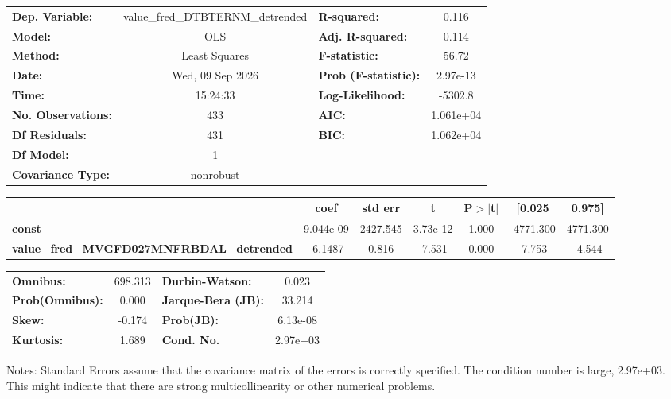 \begin{center}
\begin{tabular}{lclc}
\toprule
\textbf{Dep. Variable:}                           & value\_fred\_DTBTERNM\_detrended & \textbf{  R-squared:         } &     0.116   \\
\textbf{Model:}                                   &               OLS                & \textbf{  Adj. R-squared:    } &     0.114   \\
\textbf{Method:}                                  &          Least Squares           & \textbf{  F-statistic:       } &     56.72   \\
\textbf{Date:}                                    &         Wed, 09 Sep 2026         & \textbf{  Prob (F-statistic):} &  2.97e-13   \\
\textbf{Time:}                                    &             15:24:33             & \textbf{  Log-Likelihood:    } &   -5302.8   \\
\textbf{No. Observations:}                        &                 433              & \textbf{  AIC:               } & 1.061e+04   \\
\textbf{Df Residuals:}                            &                 431              & \textbf{  BIC:               } & 1.062e+04   \\
\textbf{Df Model:}                                &                   1              & \textbf{                     } &             \\
\textbf{Covariance Type:}                         &            nonrobust             & \textbf{                     } &             \\
\bottomrule
\end{tabular}
\begin{tabular}{lcccccc}
                                                  & \textbf{coef} & \textbf{std err} & \textbf{t} & \textbf{P$> |$t$|$} & \textbf{[0.025} & \textbf{0.975]}  \\
\midrule
\textbf{const}                                    &    9.044e-09  &     2427.545     &  3.73e-12  &         1.000        &    -4771.300    &     4771.300     \\
\textbf{value\_fred\_MVGFD027MNFRBDAL\_detrended} &      -6.1487  &        0.816     &    -7.531  &         0.000        &       -7.753    &       -4.544     \\
\bottomrule
\end{tabular}
\begin{tabular}{lclc}
\textbf{Omnibus:}       & 698.313 & \textbf{  Durbin-Watson:     } &    0.023  \\
\textbf{Prob(Omnibus):} &   0.000 & \textbf{  Jarque-Bera (JB):  } &   33.214  \\
\textbf{Skew:}          &  -0.174 & \textbf{  Prob(JB):          } & 6.13e-08  \\
\textbf{Kurtosis:}      &   1.689 & \textbf{  Cond. No.          } & 2.97e+03  \\
\bottomrule
\end{tabular}
\end{center}

Notes: \newline
 [1] Standard Errors assume that the covariance matrix of the errors is correctly specified. \newline
 [2] The condition number is large, 2.97e+03. This might indicate that there are \newline
 strong multicollinearity or other numerical problems.